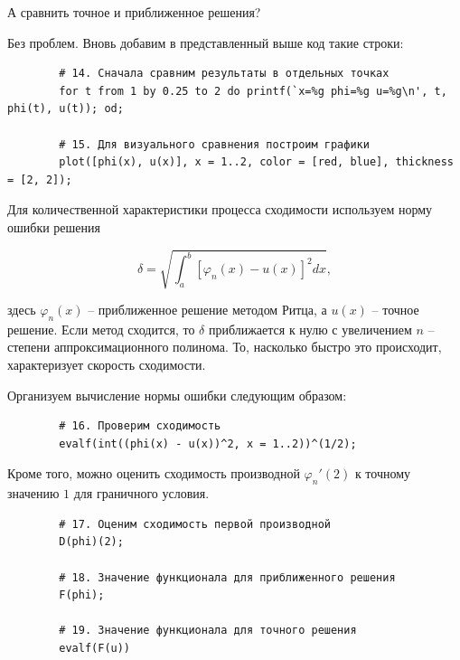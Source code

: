 \documentclass{article}
\begin{document}
\newpage
\begin{question}
	А сравнить точное и приближенное решения?
\end{question}

Без проблем. Вновь добавим в представленный выше код такие строки:

\begin{commandline}
	\begin{verbatim}
		# 14. Сначала сравним результаты в отдельных точках 
		for t from 1 by 0.25 to 2 do printf(`x=%g phi=%g u=%g\n', t, phi(t), u(t)); od;

		# 15. Для визуального сравнения построим графики
		plot([phi(x), u(x)], x = 1..2, color = [red, blue], thickness = [2, 2]);
	\end{verbatim}
\end{commandline}

Для количественной характеристики процесса сходимости используем норму ошибки решения

\begin{displaymath}
	\delta = \sqrt{ \int_{a}^{b} \left[ \varphi_{n}(x) - u(x) \right]^{2} dx },
\end{displaymath}

\noindent здесь $\varphi_{n}(x)$ -- приближенное решение методом Ритца, а $u(x)$ -- точное решение. Если метод сходится, то $\delta$ приближается к нулю с увеличением $n$ -- степени аппроксимационного полинома. То, насколько быстро это происходит, характеризует скорость сходимости.

Организуем вычисление нормы ошибки следующим образом:

\begin{commandline}
	\begin{verbatim}
		# 16. Проверим сходимость
		evalf(int((phi(x) - u(x))^2, x = 1..2))^(1/2);
	\end{verbatim}
\end{commandline}

\noindent Кроме того, можно оценить сходимость производной $\varphi_{n}'(2)$ к точному значению $1$ для граничного условия.

\begin{commandline}
	\begin{verbatim}
		# 17. Оценим сходимость первой производной
		D(phi)(2);

		# 18. Значение функционала для приближенного решения
		F(phi);

		# 19. Значение функционала для точного решения
		evalf(F(u))
	\end{verbatim}
\end{commandline}
\end{document}
